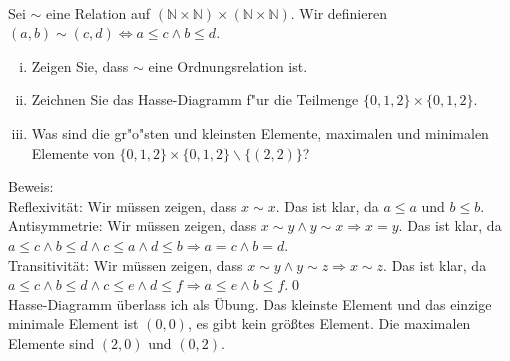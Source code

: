 \\
Sei $\sim$ eine Relation auf $(\mathbb{N}\times\mathbb{N})\times(\mathbb{N}\times\mathbb{N})$. 
Wir definieren $(a,b)\sim(c,d)\Leftrightarrow a\leq c \wedge b\leq d$. 
\begin{enumerate}[(i)]
\item Zeigen Sie, dass $\sim$ eine Ordnungsrelation ist.
\item Zeichnen Sie das Hasse-Diagramm f"ur die Teilmenge $\{0,1,2\}\times\{0,1,2\}$.
\item Was sind die gr"o"sten und kleinsten Elemente, maximalen und minimalen Elemente von $\{0,1,2\}\times\{0,1,2\}\backslash\{(2,2)\}$?
\end{enumerate}
\begin{loesung}
Beweis:\\
Reflexivität: Wir müssen zeigen, dass $x\sim x$. Das ist klar, da $a\leq a$ und $b\leq b$.\\
Antisymmetrie: Wir müssen zeigen, dass $x\sim y\wedge y\sim x\Rightarrow x=y$. Das ist klar, da $a\leq c\wedge b\leq d\wedge c\leq a\wedge d\leq b\Rightarrow a=c\wedge b=d$.\\
Transitivität: Wir müssen zeigen, dass $x\sim y\wedge y\sim z\Rightarrow x\sim z$. Das ist klar, da $a\leq c\wedge b\leq d\wedge c\leq e\wedge d\leq f\Rightarrow a\leq e\wedge b\leq f$.\qed\\
Hasse-Diagramm überlass ich als Übung. Das kleinste Element und das einzige minimale Element ist $(0,0)$, es gibt kein größtes Element. Die maximalen Elemente sind $(2,0)$ und $(0,2)$.
\end{loesung}

